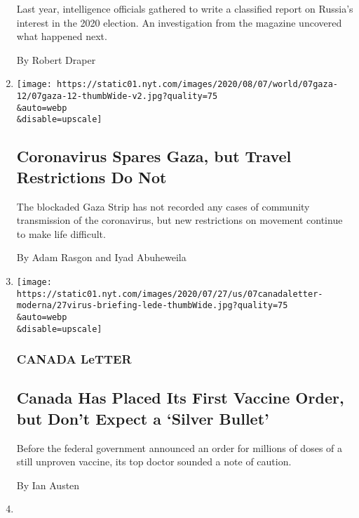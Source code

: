 \begin{enumerate}
  Last year, intelligence officials gathered to write a classified
  report on Russia's interest in the 2020 election. An investigation
  from the magazine uncovered what happened next.

  By Robert Draper
\item
  \href{/2020/08/08/world/middleeast/coronavirus-gaza.html}{}

  \texttt{[image: https://static01.nyt.com/images/2020/08/07/world/07gaza-12/07gaza-12-thumbWide-v2.jpg?quality=75\\\&auto=webp\\\&disable=upscale]}

  \hypertarget{coronavirus-spares-gaza-but-travel-restrictions-do-not}{%
  \subsection{Coronavirus Spares Gaza, but Travel Restrictions Do
  Not}\label{coronavirus-spares-gaza-but-travel-restrictions-do-not}}

  The blockaded Gaza Strip has not recorded any cases of community
  transmission of the coronavirus, but new restrictions on movement
  continue to make life difficult.

  By Adam Rasgon and Iyad Abuheweila
\item
  \href{/2020/08/07/world/canada/canada-letter-vaccine.html}{}

  \texttt{[image: https://static01.nyt.com/images/2020/07/27/us/07canadaletter-moderna/27virus-briefing-lede-thumbWide.jpg?quality=75\\\&auto=webp\\\&disable=upscale]}

  \hypertarget{canada-letter}{%
  \subsubsection{CANADA LeTTER}\label{canada-letter}}

  \hypertarget{canada-has-placed-its-first-vaccine-order-but-dont-expect-a-silver-bullet}{%
  \subsection{Canada Has Placed Its First Vaccine Order, but Don't
  Expect a `Silver
  Bullet'}\label{canada-has-placed-its-first-vaccine-order-but-dont-expect-a-silver-bullet}}

  Before the federal government announced an order for millions of doses
  of a still unproven vaccine, its top doctor sounded a note of caution.

  By Ian Austen
\item
  \href{/2020/08/07/us/coronavirus-today.html}{}


\end{enumerate}

